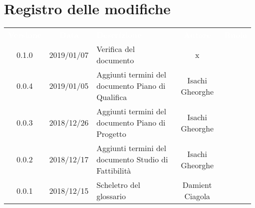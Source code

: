 
\section*{Registro delle modifiche}
{
	\renewcommand{\arraystretch}{1.5}
	\centering
	\begin{longtable}{ c c  C{4cm}  c  c }
		
		\textcolor{white}{\textbf{Versione}} & \textcolor{white}{\textbf{Data}} & \textcolor{white}{\textbf{Descrizione}} & \textcolor{white}{\textbf{Autore}} & \textcolor{white}{\textbf{Ruolo}}\\
						
		0.1.0 & 2019/01/07 & Verifica del documento & x & \ver{}\\
				
		0.0.4 & 2019/01/05 & Aggiunti termini del documento Piano di Qualifica & Isachi Gheorghe &\ver{}\\
				
		0.0.3 & 2018/12/26 &Aggiunti termini del documento Piano di Progetto & Isachi Gheorghe & \ver{}\\
				
		0.0.2 & 2018/12/17 & Aggiunti termini del documento Studio di Fattibilità & Isachi Gheorghe &\ver{}\\
		
		0.0.1 & 2018/12/15 & Scheletro del glossario & Damient Ciagola & \ana{}\\
		
	\end{longtable}

}